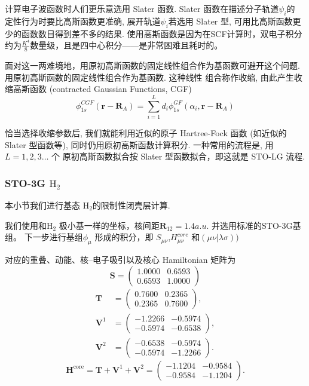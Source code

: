 \documentclass[fontset=none,12pt,a4paper]{ctexart}
\numberwithin{equation}{section}
\begin{document}
计算电子波函数时人们更乐意选用 Slater 函数. Slater 函数在描述分子轨道$\psi_i$的
定性行为时要比高斯函数更准确, 展开轨道$\psi_i$若选用 Slater 型, 可用比高斯函数更少的函数数目得到差不多的结果.
使用高斯函数是因为在SCF计算时，双电子积分约为$\frac{K^4}{8}$数量级，且是四中心积分——是非常困难且耗时的。

面对这一两难境地，用原初高斯函数的固定线性组合作为基函数可避开这个问题.
用原初高斯函数的固定线性组合作为基函数. 这种线性 组合称作收缩, 由此产生收缩高斯函数 (contracted Gaussian Functions, CGF)
\begin{equation}
  \phi_{1s}^{CGF}(\mathbf{r}-\mathbf{R}_A)=\sum_{i=1}^L d_i\phi_{1s}^{GF}(\alpha_i,\mathbf{r}-\mathbf{R}_A)
\end{equation}


恰当选择收缩参数后, 我们就能利用近似的原子 Hartree-Fock 函数 (如近似的 Slater 型函数等), 
同时仍用原初高斯函数计算积分. 一种常用的流程是, 用 $L = 1,2,3\dots$ 个 原初高斯函数拟合按 Slater 型函数拟合，即这就是 STO-LG 流程.

\subsubsection{STO-3G \texorpdfstring{$\mathrm{H}_2$}{H2}}
本小节我们进行基态 $\mathrm{H}_2$的限制性闭壳层计算.

我们使用和$\mathrm{H}_2$ 极小基一样的坐标，核间距$\mathbf{R}_12=1.4 a.u.$ 并选用标准的STO-3G基组。
下一步进行基组${\phi_\mu }$ 形成的积分，即 $S_{\mu \nu}$,$H^{core}_{\mu\nu}$ 和$(\mu\nu|\lambda\sigma))$

对应的重叠、动能、核--电子吸引以及核心 Hamiltonian 矩阵为
\begin{equation}
  \mathbf{S}=
  \begin{pmatrix}
    1.0000 & 0.6593 \\
    0.6593 & 1.0000
  \end{pmatrix}
\end{equation}
\begin{align}
  \mathbf{T} &=
  \begin{pmatrix}
    0.7600 & 0.2365 \\
    0.2365 & 0.7600
  \end{pmatrix}, \\
  \mathbf{V}^{1} &=
  \begin{pmatrix}
    -1.2266 & -0.5974 \\
    -0.5974 & -0.6538
  \end{pmatrix}, \\
  \mathbf{V}^{2} &=
  \begin{pmatrix}
    -0.6538 & -0.5974 \\
    -0.5974 & -1.2266
  \end{pmatrix}.
\end{align}
\begin{equation}
  \mathbf{H}^{\mathrm{core}}
  =\mathbf{T}+\mathbf{V}^{1}+\mathbf{V}^{2}
  =
  \begin{pmatrix}
    -1.1204 & -0.9584 \\
    -0.9584 & -1.1204
  \end{pmatrix}.
\end{equation}
\end{document}
